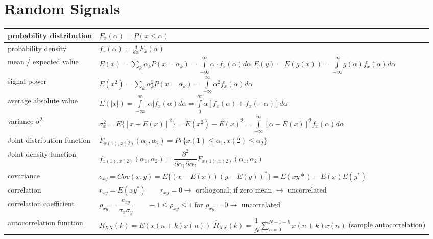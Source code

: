 \section{Random Signals}
\begin{tabularx}{\linewidth}{|l|X|}
	\hline
	probability distribution & $F_x(\alpha) = P(x \leq \alpha )$ \\
	\hline
	probability density & $f_x(\alpha) = \frac{d}{d\alpha}F_x(\alpha)$\\
	\hline
	mean / expected value & $E(x) = \sum\limits_k \alpha_k P(x = \alpha_k) =
	\int\limits_{-\infty}^{\infty}\alpha\cdot f_x(\alpha)d\alpha$ \newline
	$E(y) = E(g(x)) = \int\limits_{-\infty}^{\infty} g(\alpha)f_x(\alpha)d\alpha $
	\\
	\hline
	signal power & $E( x^2 ) = \sum\limits_k \alpha_k^2 P(x = \alpha_k) =
	\int\limits_{-\infty}^{\infty} \alpha^2 f_x(\alpha) d\alpha$ \\
	\hline
	average absolute value & $E( |x| ) = \int\limits_{-\infty}^{\infty} |\alpha| f_x(\alpha) d\alpha 
										 = \int\limits_{0}^{\infty} \alpha[f_x(\alpha) + f_x(-\alpha)] d\alpha $
	\\ \hline
	variance $\sigma^2$ & 
	$\sigma_x^2 = E\{ [x-E( x )]^2 \} = E(x^2) - E(x)^2 = 
	\int\limits_{-\infty}^{\infty}[\alpha - E( x )]^2 f_x(\alpha) d\alpha $
	\\ \hline
	Joint distribution function &
	$ F_{x(1),x(2)} (\alpha_1 , \alpha _2) = Pr\{ x(1) \leq \alpha _1 , x(2) \leq \alpha _2 \} $
	\\ \hline
	Joint density function &
	$ f_{x(1), x(2)} (\alpha _1, \alpha _2) = \dfrac{\partial^2}{\partial \alpha _1 \partial \alpha _2} F_{x(1),x(2)} 
	(\alpha_1 , \alpha_2) $
	\\ \hline
	covariance &
	$c_{xy} = Cov(x,y) = E\{(x-E(x))(y-E(y))^*\} = E(xy*) - E(x)E(y^*)$
	\\ \hline
  correlation &
  $r_{xy} = E(xy^*)  \qquad r_{xy} = 0 \rightarrow$ orthogonal; if zero mean $\rightarrow$ uncorrelated
	\\ \hline
  correlation coefficient &
  $\rho_{xy} = \dfrac{c_{xy}}{\sigma_x\sigma_y} \qquad -1\leq \rho_{xy} \leq 1$ \newline
  for $\rho_{xy} = 0 \rightarrow$ uncorrelated
	\\ \hline
	autocorrelation function & 
	$R_{XX}(k) = E(x(n+k)x(n))$ \newline
	$\hat{R}_{XX}(k) = \dfrac{1}{N}\sum\limits_{n=0}^{N-1-k} x(n+k)x(n)$ \qquad (sample autocorrelation) \newline

\end{tabularx}
